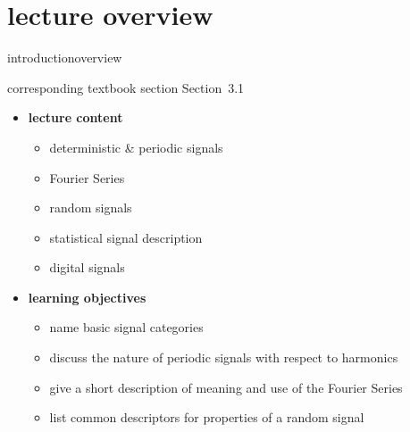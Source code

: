 


\subtitle{Module 3.0: Input Representation~---~Signals}


	

    \section[overview]{lecture overview}
        \begin{frame}{introduction}{overview}
            \begin{block}{corresponding textbook section}
                Section~3.1
            \end{block}

            \begin{itemize}
                \item   \textbf{lecture content}
                    \begin{itemize}
                        \item   deterministic \& periodic signals
                        \item   Fourier Series
                        \item   random signals
                        \item   statistical signal description
                        \item   digital signals
                    \end{itemize}
                \bigskip
                \item<2->   \textbf{learning objectives}
                    \begin{itemize}
                        \item   name basic signal categories
                        \item   discuss the nature of periodic signals with respect to harmonics
                        \item   give a short description of meaning and use of the Fourier Series
                        \item   list common descriptors for properties of a random signal
                    \end{itemize}
            \end{itemize}
        \end{frame}
        
